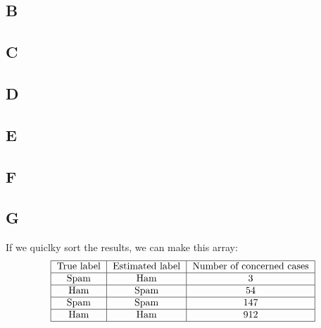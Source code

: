 \documentclass{article}
\begin{document}
        \subsection{B}
        \subsection{C}
        \subsection{D}
        \subsection{E}
        \subsection{F}
        \subsection{G}
            If we quiclky sort the results, we can make this array:
            \[
                \begin{tabular}{|c|c|c|}
                    \hline
                    True label & Estimated label & Number of concerned cases\\
                    \hline
                    Spam & Ham & 3\\
                    \hline
                    Ham & Spam & 54\\
                    \hline
                    Spam & Spam & 147\\
                    \hline
                    Ham & Ham & 912\\
                    \hline
                \end{tabular}
            \]
\end{document}
